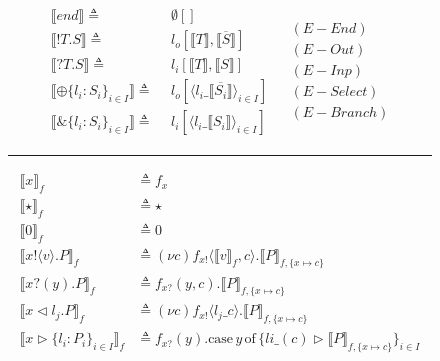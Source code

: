 \begin{figure}[h]
    \centering
    \begin{align*}
        \begin{split}
            \llbracket end \rrbracket \triangleq \:&\: \emptyset[]\\
            \llbracket !T.S \rrbracket \triangleq \:&\: l_o[\llbracket T \rrbracket, \llbracket \overline{S} \rrbracket]\\
            \llbracket ?T.S \rrbracket \triangleq \:&\: l_i[\llbracket T \rrbracket, \llbracket S \rrbracket]\\
            \llbracket \oplus \{ l_i : S_i \}_{i \in I} \rrbracket \triangleq \:&\: l_o[\langle l_i\_\llbracket \overline{S_i} \rrbracket \rangle_{i \in I}]\\
            \llbracket \& \{ l_i : S_i \}_{i \in I} \rrbracket \triangleq \:&\: l_i[\langle l_i\_\llbracket S_i \rrbracket \rangle_{i \in I}]
        \end{split}
        \begin{split}
            & (E-End) \\[2pt]
            & (E-Out) \\[2pt]
            & (E-Inp) \\[2pt]
            & (E-Select) \\[2pt]
            & (E-Branch)
        \end{split}
    \end{align*}
    \noindent\rule{12cm}{0.8pt}
    \begin{equation*}
        \begin{split}
            \llbracket x \rrbracket_f & \triangleq f_x  \\
            \llbracket \star \rrbracket_f & \triangleq \star \\
            \llbracket 0 \rrbracket_f & \triangleq 0 \\
            \llbracket x!\langle v \rangle.P \rrbracket_f & \triangleq (\nu c) f_{x!}\langle \llbracket v \rrbracket_f , c \rangle.\llbracket P \rrbracket_{f, \{ x \mapsto c \}} \\
            \llbracket x?(y).P \rrbracket_f & \triangleq f_{x?}(y,  c).\llbracket P \rrbracket_{f, \{ x \mapsto c \}}\\
            \llbracket x \vartriangleleft l_j.P \rrbracket_f & \triangleq (\nu c) f_{x!}\langle l_j\_c\rangle.\llbracket P \rrbracket_{f, \{ x \mapsto c\}}\\
            \llbracket x \vartriangleright \{ l_i : P_i \}_{i \in I} \rrbracket_f & \triangleq f_{x?}(y). \text{case} \, y \, \text{of}\, \{li\_(c) \vartriangleright \llbracket P \rrbracket_{f, \{ x \mapsto c \}}\}_{i \in I}\\

\end{split}
\end{equation*}
\end{figure}
